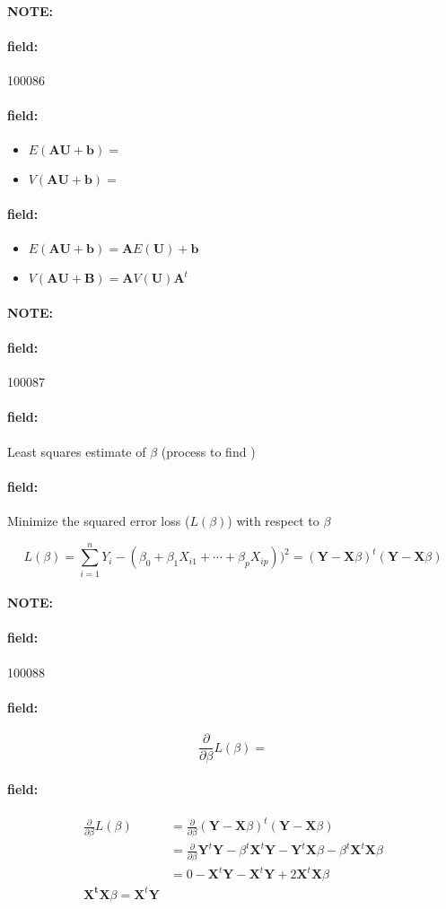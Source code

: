 \documentclass[12pt]{article}
\newenvironment{note}{\paragraph{NOTE:}}{}
\newenvironment{field}{\paragraph{field:}}{}
\begin{document}
\begin{note} \begin{field} \tiny 100086 \end{field}
  \begin{field}
    \begin{itemize}
      \item $E(\textbf{AU} + \textbf{b}) = $
      \item $V(\mathbf{AU + \mathbf{b}}) = $
    \end{itemize}
  \end{field}
  \begin{field}
    \begin{itemize}
      \item $E(\textbf{AU} + \textbf{b}) = \mathbf{A} E(\mathbf{U}) + \mathbf{b}$
      \item $V(\mathbf{AU + \mathbf{B}}) = \mathbf{A}V(\mathbf{U}) \mathbf{A}^t$
    \end{itemize}
  \end{field}
\end{note}


\begin{note} \begin{field} \tiny 100087 \end{field}
  \begin{field}
    Least squares estimate of $\beta$ (process to find )
  \end{field}
  \begin{field}
    Minimize the squared error loss ($L(\beta)$) with respect to $\beta$

      $$ L(\beta ) = \sum_{i=1}^n Y_i - (\beta_0 + \beta_1 X_{i1} + \cdots + \beta_p X_{ip}))^2 = (\mathbf{Y} - \mathbf{X}\beta)^t(\mathbf{Y} - \mathbf{X}\beta)$$
  \end{field}
\end{note}

\begin{note} \begin{field} \tiny 100088 \end{field}
  \begin{field}
    $$  \frac{\partial}{\partial \beta} L(\beta) = $$
  \end{field}
  \begin{field}
    \begin{align*}
       \frac{\partial}{\partial \beta} L(\beta)  &= \frac{\partial}{\partial \beta} (\mathbf{Y} - \mathbf{X}\beta)^t(\mathbf{Y} - \mathbf{X}\beta)\\
       &= \frac{\partial}{\partial \beta}  \mathbf{Y}^t \mathbf{Y} - \beta^t \mathbf{X}^t
\textbf{Y} - \mathbf{Y}^t \mathbf{X}\beta - \beta^t \mathbf{X}^t \mathbf{X} \beta \\
&= 0 - \mathbf{X}^t \mathbf{Y} - \mathbf{X}^t \mathbf{Y} + 2 \mathbf{X}^t \mathbf{X} \beta  \\
\mathbf{X^t}\mathbf{X}\beta = \mathbf{X}^t \mathbf{Y}
    \end{align*}
  \end{field}
\end{note}
\end{document}
